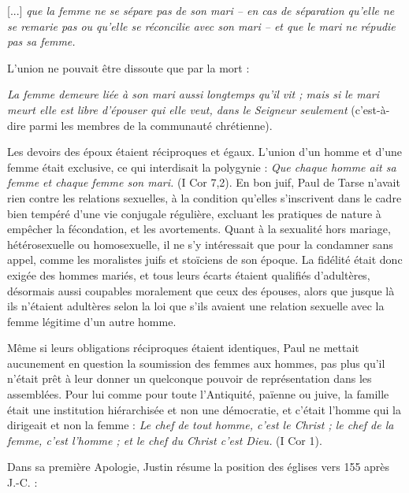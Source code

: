 \begin{displayquote}[I Cor 7,10-12]

[...] \emph{que la femme ne se sépare pas de son mari -- en cas de séparation qu'elle ne se remarie pas ou qu'elle se réconcilie avec son mari -- et que le mari ne répudie pas sa femme.}
\end{displayquote}

L'union ne pouvait être dissoute que par la mort :

\begin{displayquote}[I Cor 7,39]
\emph{La femme demeure liée à son mari aussi longtemps qu'il vit ; mais si le mari meurt elle est libre d'épouser qui elle veut, dans le Seigneur seulement} (c'est-à-dire parmi les membres de la communauté chrétienne).
\end{displayquote}
 
 Les devoirs des époux étaient réciproques et égaux. L'union d'un homme et d'une femme était exclusive, ce qui interdisait la polygynie : \emph{Que chaque homme ait sa femme et chaque femme son mari.} (I Cor 7,2). En bon juif, Paul de Tarse n'avait rien contre les relations sexuelles, à la condition qu'elles s'inscrivent dans le cadre bien tempéré d'une vie conjugale régulière, excluant les pratiques de nature à empêcher la fécondation, et les avortements. Quant à la sexualité hors mariage, hétérosexuelle ou homosexuelle, il ne s'y intéressait que pour la condamner sans appel, comme les moralistes juifs et stoïciens de son époque. La fidélité était donc exigée des hommes mariés, et tous leurs écarts étaient qualifiés d'adultères, désormais aussi coupables moralement que ceux des épouses, alors que jusque là ils n'étaient adultères selon la loi que s'ils avaient une relation sexuelle avec la femme légitime d'un autre homme. 
 
 Même si leurs obligations réciproques étaient identiques, Paul ne mettait aucunement en question la soumission des femmes aux hommes, pas plus qu'il n'était prêt à leur donner un quelconque pouvoir de représentation dans les assemblées. Pour lui comme pour toute l'Antiquité, païenne ou juive, la famille était une institution hiérarchisée et non une démocratie, et c'était l'homme qui la dirigeait et non la femme : \emph{Le chef de tout homme, c'est le Christ ; le chef de la femme, c'est l'homme ; et le chef du Christ c'est Dieu.} (I Cor 1).

\pagebreak
Dans sa première Apologie, Justin résume la position des églises vers 155 après J.-C. :%
\nopagebreak[4]

